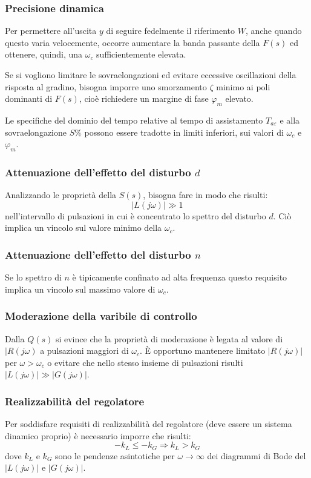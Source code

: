 \documentclass[a4paper]{report}
\begin{document}
\subsubsection{Precisione dinamica}
Per permettere all'uscita $y$ di seguire fedelmente il riferimento
$W$, anche quando questo varia velocemente, occorre aumentare la banda
passante della $F(s)$ ed ottenere, quindi, una $\omega_c$
sufficientemente elevata.

Se si vogliono limitare le sovraelongazioni ed evitare eccessive
oscillazioni della risposta al gradino, bisogna imporre uno
smorzamento $\zeta$ minimo ai poli dominanti di $F(s)$, cio\`e
richiedere un margine di fase $\varphi_m$ elevato.

Le specifiche del dominio del tempo relative al tempo di assistamento
$T_{a\varepsilon}$ e alla sovraelongazione $S\%$ possono essere
tradotte in limiti inferiori, sui valori di $\omega_c$ e $\varphi_m$.

\subsubsection{Attenuazione dell'effetto del disturbo $d$}
Analizzando le propriet\`a della $S(s)$, bisogna fare in modo che
risulti:
\[
|L(j \omega)| \gg 1
\]
nell'intervallo di pulsazioni in cui \`e concentrato lo spettro del
disturbo $d$. Ci\`o implica un vincolo sul valore minimo della
$\omega_c$.

\subsubsection{Attenuazione dell'effetto del disturbo $n$}
Se lo spettro di $n$ \`e tipicamente confinato ad alta frequenza
questo requisito implica un vincolo sul massimo valore di $\omega_c$.

\subsubsection{Moderazione della varibile di controllo}
Dalla $Q(s)$ si evince che la propriet\`a di moderazione \`e legata al
valore di $|R(j \omega)$ a pulsazioni maggiori di $\omega_c$. \`E
opportuno mantenere limitato $|R(j \omega)|$ per $\omega > \omega_c$ o
evitare che nello stesso insieme di pulsazioni risulti $|L(j \omega)|
\gg |G(j \omega)|$.

\subsubsection{Realizzabilit\`a del regolatore}
Per soddisfare requisiti di realizzabilit\`a del regolatore (deve
essere un sistema dinamico proprio) \`e necessario imporre che
risulti:
\[
-k_L \leq -k_G \Rightarrow k_L > k_G
\]
dove $k_L$ e $k_G$ sono le pendenze asintotiche per $\omega \to
\infty$ dei diagrammi di Bode del $|L(j \omega)|$ e $|G(j \omega)|$.
\end{document}
